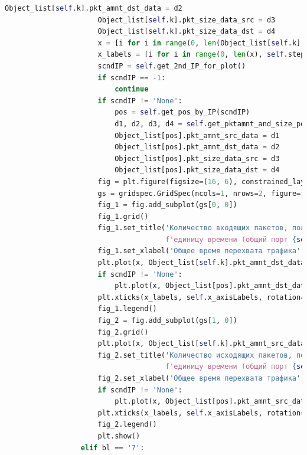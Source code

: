\documentclass[bachelor, och, coursework]{SCWorks}
\begin{document}
\begin{lstlisting}[language=Python]
                      Object_list[self.k].pkt_amnt_dst_data = d2
                      Object_list[self.k].pkt_size_data_src = d3
                      Object_list[self.k].pkt_size_data_dst = d4
                      x = [i for i in range(0, len(Object_list[self.k].pkt_amnt_src_data))]
                      x_labels = [i for i in range(0, len(x), self.step)]
                      scndIP = self.get_2nd_IP_for_plot()
                      if scndIP == -1:
                          continue
                      if scndIP != 'None':
                          pos = self.get_pos_by_IP(scndIP)
                          d1, d2, d3, d4 = self.get_pktamnt_and_size_persec(scndIP)
                          Object_list[pos].pkt_amnt_src_data = d1
                          Object_list[pos].pkt_amnt_dst_data = d2
                          Object_list[pos].pkt_size_data_src = d3
                          Object_list[pos].pkt_size_data_dst = d4
                      fig = plt.figure(figsize=(16, 6), constrained_layout=True)
                      gs = gridspec.GridSpec(ncols=1, nrows=2, figure=fig)
                      fig_1 = fig.add_subplot(gs[0, 0])
                      fig_1.grid()
                      fig_1.set_title('Количество входящих пакетов, полученных за ' + \
                                      f'единицу времени (общий порт {self.curPort})', fontsize=15 )
                      fig_1.set_xlabel('Общее время перехвата трафика', fontsize=15)
                      plt.plot(x, Object_list[self.k].pkt_amnt_dst_data, 'b', label=self.curIP)
                      if scndIP != 'None':
                          plt.plot(x, Object_list[pos].pkt_amnt_dst_data, 'r', label=scndIP)
                      plt.xticks(x_labels, self.x_axisLabels, rotation=30, fontsize=8)
                      fig_1.legend()
                      fig_2 = fig.add_subplot(gs[1, 0])
                      fig_2.grid()
                      plt.plot(x, Object_list[self.k].pkt_amnt_src_data, 'orange', label=self.curIP)
                      fig_2.set_title('Количество исходящих пакетов, полученных за ' + \
                                      f'единицу времени (общий порт {self.curPort})', fontsize=15 )
                      fig_2.set_xlabel('Общее время перехвата трафика', fontsize=15)
                      if scndIP != 'None':
                          plt.plot(x, Object_list[pos].pkt_amnt_src_data, 'g', label=scndIP)
                      plt.xticks(x_labels, self.x_axisLabels, rotation=30, fontsize=8)
                      fig_2.legend()
                      plt.show()
                  elif bl == '7':

\end{lstlisting}
\end{document}
